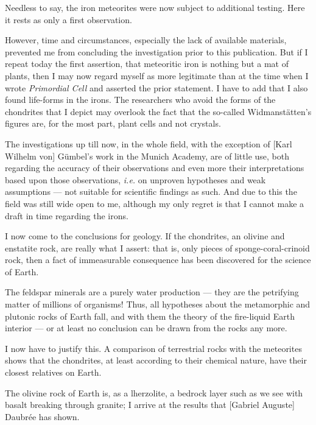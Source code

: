 \documentclass[a4paper, 12pt, oneside]{article}
\begin{document}
Needless to say, the iron meteorites were now subject to additional testing. Here it rests as only a first observation.

However, time and circumstances, especially the lack of available materials, prevented me from concluding the investigation prior to this publication. But if I repeat today the first assertion, that meteoritic iron is nothing but a mat of plants, then I may now regard myself as more legitimate than at the time when I wrote \emph{Primordial Cell} and asserted the prior statement. I have to add that I also found life-forms in the irons. The researchers who avoid the forms of the chondrites that I depict may overlook the fact that the so-called Widmanstätten's figures are, for the most part, plant cells and not crystals.

The investigations up till now, in the whole field, with the exception of [Karl Wilhelm von] Gümbel's work in the Munich Academy, are of little use, both regarding the accuracy of their observations and even more their interpretations based upon those observations, \emph{i.e.} on unproven hypotheses and weak assumptions --- not suitable for scientific findings as such. And due to this the field was still wide open to me, although my only regret is that I cannot make a draft in time regarding the irons.

I now come to the conclusions for geology. If the chondrites, an olivine and enstatite rock, are really what I assert: that is, only pieces of sponge-coral-crinoid rock, then a fact of immeasurable consequence has been discovered for the science of Earth.

The feldspar minerals are a purely water production --- they are the petrifying matter of millions of organisms! Thus, all hypotheses about the metamorphic and plutonic rocks of Earth fall, and with them the theory of the fire-liquid Earth interior --- or at least no conclusion can be drawn from the rocks any more.

I now have to justify this. A comparison of terrestrial rocks with the meteorites shows that the chondrites, at least according to their chemical nature, have their closest relatives on Earth.

The olivine rock of Earth is, as a lherzolite, a bedrock layer such as we see with basalt breaking through granite; I arrive at the results that [Gabriel Auguste] Daubrée has shown.
\end{document}
